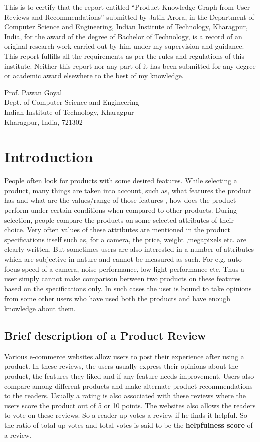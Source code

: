 \documentclass[12pt]{article}
\begin{document}
\vspace{20px}

This is to certify that the report entitled “Product Knowledge Graph from User Reviews and Recommendations” submitted by Jatin Arora, in the Department of Computer Science and Engineering, Indian Institute of Technology, Kharagpur, India, for the award of the degree of Bachelor of Technology, is a record of an original research work carried out by him under my supervision and guidance. This report fulfills all the requirements as per the rules and regulations of this institute. Neither this report nor any part of it has been submitted for any degree or academic award elsewhere to the best of my knowledge. 

\vspace{100px}
\noindent
Prof. Pawan Goyal \\
Dept. of Computer Science and Engineering \\
Indian Institute of Technology, Kharagpur  \\
Kharagpur, India, 721302

\pagebreak

\section{Introduction}
People often look for products with some desired features. While selecting a product, many things are taken into account, such as, what features the product has and what are the values/range of those features , how does the product perform under certain conditions when compared to other products. During  selection, people compare the products  on some selected attributes of their choice.  Very often values of these attributes are mentioned in the product specifications itself such as, for a camera, the price, weight ,megapixels etc. are clearly written. But sometimes users are also interested in a number of attributes which are subjective in nature and cannot be measured as such. For e.g. auto-focus speed of a camera, noise performance, low light performance etc. Thus a user simply cannot make comparison between two products on these features based on the specifications only. In such cases the user is bound to take opinions from some other users who have used both the products and have enough knowledge about them.


\subsection{Brief description  of a Product Review}
Various e-commerce websites allow users to post their experience after using a product. In these reviews, the users usually express their opinions about the product, the features they liked and if any feature needs improvement. Users also compare among different products and  make alternate product recommendations to the readers. Usually a rating is also associated with these reviews where the users score the product out of 5 or 10 
points. The websites also allows the readers to vote on these reviews. So a reader up-votes a review if he finds it helpful. So the ratio of total up-votes and total votes is said to be the \textbf{helpfulness score} of a review.  \\ 
\end{document}
